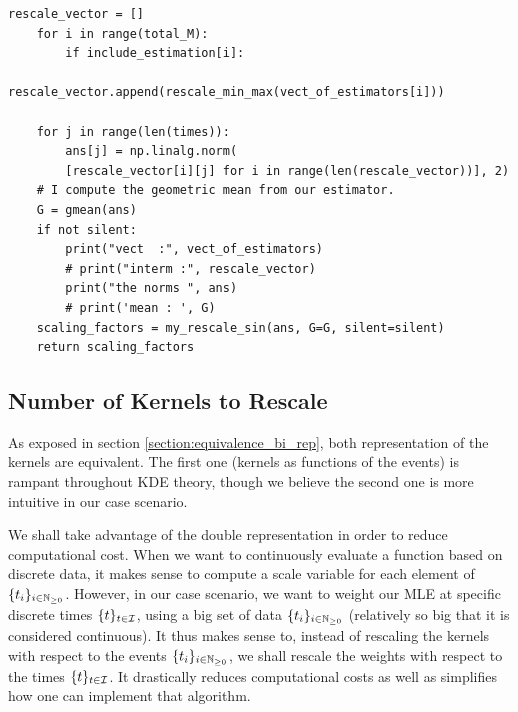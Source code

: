 \begin{Verbatim}[fontsize=\footnotesize]
    rescale_vector = []
    for i in range(total_M):
        if include_estimation[i]:
            rescale_vector.append(rescale_min_max(vect_of_estimators[i]))

    for j in range(len(times)):
        ans[j] = np.linalg.norm(
        [rescale_vector[i][j] for i in range(len(rescale_vector))], 2)
    # I compute the geometric mean from our estimator.
    G = gmean(ans)
    if not silent:
        print("vect  :", vect_of_estimators)
        # print("interm :", rescale_vector)
        print("the norms ", ans)
        # print('mean : ', G)
    scaling_factors = my_rescale_sin(ans, G=G, silent=silent)
    return scaling_factors
\end{Verbatim}

\subsection{Number of Kernels to Rescale}
As exposed in section \ref{section:equivalence_bi_rep}, both representation of the kernels are equivalent. The first one (kernels as functions of the events) is rampant throughout KDE theory, though we believe the second one is more intuitive in our case scenario.

We shall take advantage of the double representation in order to reduce computational cost. When we want to continuously evaluate a function based on discrete data, it makes sense to compute a scale variable for each element of $\{ t_i \}_{ i \in \mathbb{N}_{\geq 0}}$. However, in our case scenario, we want to weight our MLE at specific discrete times $\{t\}_{t \in \mathcal I}$, using a big set of data $\{ t_i \}_{ i \in \mathbb{N}_{\geq 0}}$ (relatively so big that it is considered continuous). It thus makes sense to, instead of rescaling the kernels with respect to the events $\{ t_i \}_{ i \in \mathbb{N}_{\geq 0}}$, we shall rescale the weights with respect to the times $\{t\}_{t \in \mathcal I}$. It drastically reduces computational costs as well as simplifies how one can implement that algorithm.




